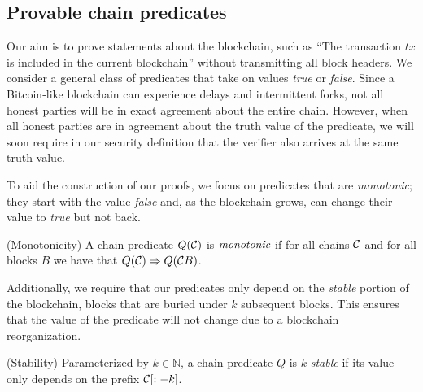 \subsection{Provable chain predicates}

Our aim is to prove statements about the blockchain, such as ``The transaction
$tx$ is included in the current blockchain'' without transmitting all block
headers. We consider a general class of predicates that take on values
\emph{true} or \emph{false}.  Since a Bitcoin-like blockchain can experience
delays and intermittent forks, not all honest parties will be in exact agreement
about the entire chain. However, when all honest parties are in agreement about
the truth value of the predicate, we will soon require in our security
definition that the verifier also arrives at the same truth value.

To aid the construction of our proofs, we focus on predicates that are
\emph{monotonic}; they start with the value \emph{false} and, as the blockchain
grows, can change their value to \emph{true} but not back.

\begin{definition}{(Monotonicity)}
    A chain predicate $Q(\mathcal{C})$ is $\emph{monotonic}$ if for all chains
    $\mathcal{C}$ and for all blocks $B$ we have that
    $Q(\mathcal{C}) \Rightarrow Q(\mathcal{C} B)$.
\end{definition}

Additionally, we require that our predicates only depend on the \emph{stable}
portion of the blockchain, blocks that are buried under $k$ subsequent blocks.
This ensures that the value of the predicate will not change due to a blockchain
reorganization.

\begin{definition}{(Stability)}
    Parameterized by $k \in \mathbb{N}$, a chain predicate $Q$ is
    $k$-\emph{stable} if its value only depends on the prefix $\mathcal{C}[:-k]$.
\end{definition}
